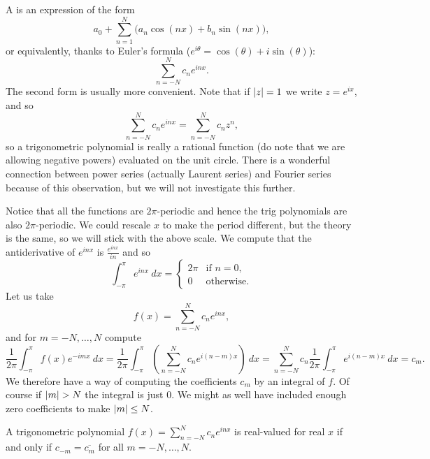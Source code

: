 A \emph{} is an expression of the form
\begin{equation*}
a_0 + \sum_{n=1}^N \bigl(a_n \cos(nx) + b_n \sin(nx) \bigr),
\end{equation*}
or equivalently, thanks to Euler's formula ($e^{i\theta} = \cos(\theta) + i
\sin(\theta)$):
\begin{equation*}
\sum_{n=-N}^N c_n e^{inx} .
\end{equation*}
The second form is usually more convenient.  Note that if
$\lvert {z} \rvert=1$ we write $z = e^{ix}$, and so
\begin{equation*}
\sum_{n=-N}^N c_n e^{inx} = 
\sum_{n=-N}^N c_n z^n ,
\end{equation*}
so a trigonometric polynomial is really a rational function (do note that
we are allowing negative powers) evaluated on the unit circle.  There is
a wonderful connection between power series (actually Laurent series) and
Fourier series because of this observation,
but we will not investigate this further.

Notice that all the functions are $2\pi$-periodic and hence the trig
polynomials are also $2\pi$-periodic.
We could rescale $x$ to make the period different, but the theory is the
same, so we will stick with the above scale.
We compute that the antiderivative of $e^{inx}$ is $\frac{e^{inx}}{in}$ and
so
\begin{equation*}
\int_{-\pi}^\pi e^{inx} ~ dx =
\begin{cases}
2\pi & \text{if $n=0$,} \\
0 & \text{otherwise.}
\end{cases}
\end{equation*}
Let us take
\begin{equation*}
f(x) = \sum_{n=-N}^N c_n e^{inx} ,
\end{equation*}
and for $m=-N,\ldots,N$ compute
\begin{equation*}
\frac{1}{2\pi} \int_{-\pi}^\pi
f(x) e^{-imx} ~ dx
=
\frac{1}{2\pi} \int_{-\pi}^\pi
\left(\sum_{n=-N}^N c_n e^{i(n-m)x}\right) ~ dx
=
\sum_{n=-N}^N
c_n
\frac{1}{2\pi}
\int_{-\pi}^\pi
e^{i(n-m)x}
 ~ dx
=
c_m .
\end{equation*}
We therefore have a way of computing the coefficients $c_m$ by an integral
of $f$.  Of course if $\lvert {m} \rvert > N$ the integral is just 0.  We might as
well have included enough zero coefficients to make $\lvert {m} \rvert \leq N$.

\begin{prop}
A trigonometric polynomial
$f(x) = \sum_{n=-N}^N c_n e^{inx}$
is real-valued for real $x$ if
and only if $c_{-m} = \overline{c_m}$ for all $m=-N,\ldots,N$.
\end{prop}

